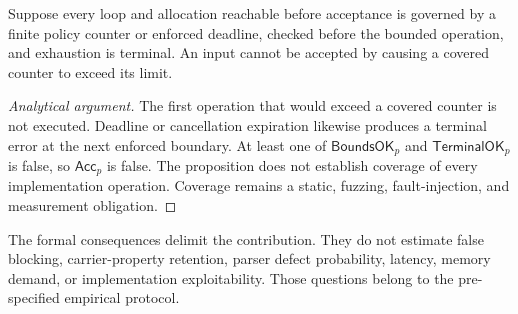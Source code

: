\begin{proposition}
\label{prop:bounded-rejection}
Suppose every loop and allocation reachable before acceptance is governed by a
finite policy counter or enforced deadline, checked before the bounded
operation, and exhaustion is terminal. An input cannot be accepted by causing a
covered counter to exceed its limit.
\end{proposition}

\begin{proof}[Analytical argument]
The first operation that would exceed a covered counter is not executed.
Deadline or cancellation expiration likewise produces a terminal error at the
next enforced boundary. At least one of $\mathsf{BoundsOK}_p$ and
$\mathsf{TerminalOK}_p$ is false, so $\mathsf{Acc}_p$ is false. The proposition
does not establish coverage of every implementation operation. Coverage remains
a static, fuzzing, fault-injection, and measurement obligation.
\end{proof}

The formal consequences delimit the contribution. They do not estimate false
blocking, carrier-property retention, parser defect probability, latency,
memory demand, or implementation exploitability. Those questions belong to the
pre-specified empirical protocol.
